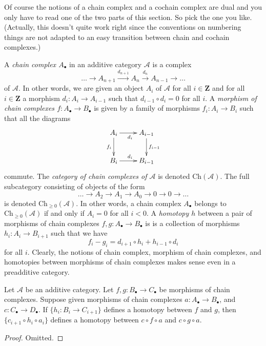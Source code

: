 \noindent
Of course the notions of a chain complex and a cochain complex
are dual and you only have to read one of the two parts of
this section. So pick the one you like. (Actually, this doesn't
quite work right since the conventions on numbering things
are not adapted to an easy transition between chain and cochain
complexes.)

\medskip\noindent
A {\it chain complex $A_\bullet$} in an additive category $\mathcal{A}$
is a complex
$$
\ldots \to
A_{n + 1} \xrightarrow{d_{n + 1}}
A_n \xrightarrow{d_n}
A_{n - 1} \to
\ldots
$$
of $\mathcal{A}$. In other words, we are given an object $A_i$ of
$\mathcal{A}$ for all $i \in \mathbf{Z}$ and for
all $i \in \mathbf{Z}$ a morphism $d_i : A_i \to A_{i - 1}$ such that
$d_{i - 1} \circ d_i = 0$ for all $i$. A {\it morphism of chain
complexes $f : A_\bullet \to B_\bullet$} is given by a
family of morphisms $f_i : A_i \to B_i$ such that all
the diagrams
$$
\xymatrix{
A_i \ar[r]_{d_i} \ar[d]_{f_i} & A_{i - 1} \ar[d]^{f_{i - 1}} \\
B_i \ar[r]^{d_i} & B_{i - 1}
}
$$
commute. The {\it category of chain complexes of $\mathcal{A}$}
is denoted $\text{Ch}(\mathcal{A})$. The full subcategory consisting
of objects of the form
$$
\ldots \to A_2 \to A_1 \to A_0 \to 0 \to 0 \to \ldots
$$
is denoted $\text{Ch}_{\geq 0}(\mathcal{A})$.
In other words, a chain complex $A_\bullet$ belongs to
$\text{Ch}_{\geq 0}(\mathcal{A})$ if and only if
$A_i = 0$ for all $i < 0$.
A {\it homotopy $h$} between a pair of morphisms
of chain complexes $f, g : A_\bullet \to B_\bullet$ is
is a collection of morphisms $h_i : A_i \to B_{i + 1}$
such that we have
$$
f_i - g_i = d_{i + 1} \circ h_i + h_{i - 1} \circ d_i
$$
for all $i$. Clearly, the notions of chain complex, morphism of
chain complexes, and homotopies between morphisms of chain complexes
makes sense even in a preadditive category.

\begin{lemma}
\label{lemma-compose-homotopy}
Let $\mathcal{A}$ be an additive category.
Let $f, g : B_\bullet \to C_\bullet$ be morphisms
of chain complexes. Suppose given morphisms of chain
complexes $a : A_\bullet \to B_\bullet$, and
$c : C_\bullet \to D_\bullet$.
If $\{h_i : B_i \to C_{i + 1}\}$ defines a homotopy
between $f$ and $g$, then $\{c_{i + 1} \circ h_i \circ a_i\}$
defines a homotopy between $c \circ f \circ a$ and
$c \circ g \circ a$.
\end{lemma}

\begin{proof}
Omitted.
\end{proof}

